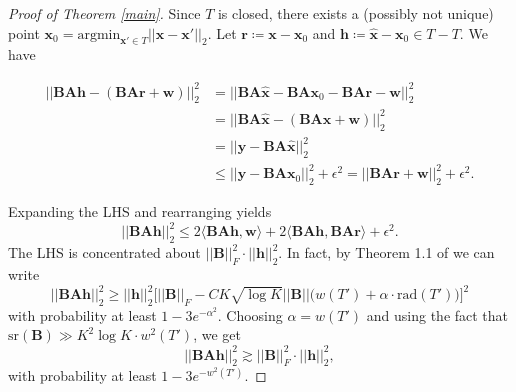 \documentclass{article}
\def \xhat {\mathbf{\hat{x}}}
\begin{document}
\begin{proof}[Proof of Theorem \ref{main}]
Since $T$ is closed, there exists a (possibly not unique) point $\mathbf{x}_0 = \mathrm{argmin}_{\mathbf{x}' \in T} ||\mathbf{x} - \mathbf{x}'||_2$. Let $\mathbf{r} \coloneqq \mathbf{x} - \mathbf{x}_0$ and $\mathbf{h} \coloneqq \xhat - \mathbf{x}_0 \in T-T$. We have

    \begin{align}
        ||\mathbf{B} \mathbf{A}\mathbf{h} - (\mathbf{B}\mathbf{A}\mathbf{r}+\mathbf{w})||_2^2 & = ||\mathbf{B}\mathbf{A}\xhat - \mathbf{B}\mathbf{A}\mathbf{x}_0 - \mathbf{B}\mathbf{A} \mathbf{r} - \mathbf{w}||_2^2 \\
        &= ||\mathbf{B} \mathbf{A} \xhat - (\mathbf{B} \mathbf{A} \mathbf{x} + \mathbf{w})||_2^2 \\
        &= ||\mathbf{y}-\mathbf{B} \mathbf{A}\xhat||_2^2 \\
        & \leq ||\mathbf{y}-\mathbf{B}\mathbf{A}\mathbf{x}_0||_2^2 + \epsilon^2 = ||\mathbf{B} \mathbf{A}\mathbf{r}+\mathbf{w}||_2^2 + \epsilon^2.
    \end{align}


Expanding the LHS and rearranging yields
\begin{equation} \label{one}
        ||\mathbf{B} \mathbf{A} \mathbf{h}||_2^2  \leq 2\langle \mathbf{B} \mathbf{A} \mathbf{h}, \mathbf{w} \rangle + 2\langle \mathbf{B} \mathbf{A} \mathbf{h}, \mathbf{B} \mathbf{A} \mathbf{r} \rangle + \epsilon^2.
\end{equation}
The LHS is concentrated about $||\mathbf{B}||_F^2 \cdot ||\mathbf{h}||_2^2$. In fact, by Theorem 1.1 of \cite{jeong2020subgaussian} we can write
\begin{equation}
    ||\mathbf{B} \mathbf{A}\mathbf{h}||_2^2 \geq ||\mathbf{h}||_2^2 \Big[ ||\mathbf{B}||_F - CK\sqrt{\log K} ||\mathbf{B}|| \big(w(T')+ \alpha \cdot \mathrm{rad}(T')\big) \Big]^2
\end{equation}
with probability at least $1-3e^{-\alpha^2}$. Choosing $\alpha = w(T')$ and using the fact that $\mathrm{sr}(\mathbf{B}) \gg K^2 \log K \cdot w^2(T')$, we get
\begin{equation} \label{lb}
    ||\mathbf{B} \mathbf{A}\mathbf{h}||_2^2 \gtrsim ||\mathbf{B}||_F^2 \cdot ||\mathbf{h}||_2^2,
\end{equation}
with probability at least $1-3e^{-w^2(T')}$.


\end{proof}
\end{document}
